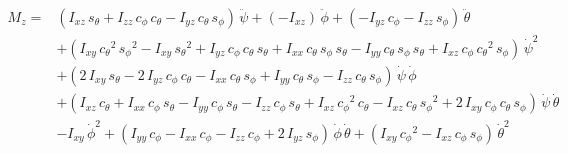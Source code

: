 \documentclass[a4paper]{article}
\begin{document}
\[\begin{aligned}
    M_z =&
\left(I_{xz}\,s_\theta+I_{zz}\,c_\phi\,c_\theta-I_{yz}\,c_\theta\,s_\phi\right)\,\ddot{\psi}+\left(-I_{xz}\right)\,\ddot{\phi}+\left(-I_{yz}\,c_\phi-I_{zz}\,s_\phi\right)\,\ddot{\theta} \\
         &+\left(I_{xy}\,{c_\theta}^2\,{s_\phi}^2-I_{xy}\,{s_\theta}^2+I_{yz}\,c_\phi\,c_\theta\,s_\theta+I_{xx}\,c_\theta\,s_\phi\,s_\theta-I_{yy}\,c_\theta\,s_\phi\,s_\theta+I_{xz}\,c_\phi\,{c_\theta}^2\,s_\phi\right)\,{\dot{\psi}}^2 \\
         &+\left(2\,I_{xy}\,s_\theta-2\,I_{yz}\,c_\phi\,c_\theta-I_{xx}\,c_\theta\,s_\phi+I_{yy}\,c_\theta\,s_\phi-I_{zz}\,c_\theta\,s_\phi\right)\,\dot{\psi}\,\dot{\phi} \\
         &+\left(I_{xz}\,c_\theta+I_{xx}\,c_\phi\,s_\theta-I_{yy}\,c_\phi\,s_\theta-I_{zz}\,c_\phi\,s_\theta+I_{xz}\,{c_\phi}^2\,c_\theta-I_{xz}\,c_\theta\,{s_\phi}^2+2\,I_{xy}\,c_\phi\,c_\theta\,s_\phi\right)\,\dot{\psi}\,\dot{\theta} \\
         &-I_{xy}\,{\dot{\phi}}^2+\left(I_{yy}\,c_\phi-I_{xx}\,c_\phi-I_{zz}\,c_\phi+2\,I_{yz}\,s_\phi\right)\,\dot{\phi}\,\dot{\theta}+\left(I_{xy}\,{c_\phi}^2-I_{xz}\,c_\phi\,s_\phi\right)\,{\dot{\theta}}^2
  \end{aligned}
\]
\end{document}
